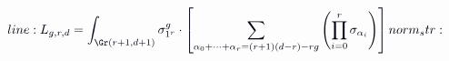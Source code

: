 \documentclass[12pt]{article}
\begin{document}
\makeatletter
\renewcommand*{\@textcolor}[3]{%
  \protect\leavevmode
  \begingroup
    \color#1{#2}#3%
  \endgroup
}
\makeatother
\begin{displaymath}
\mathcolor[RGB]{0,0,15}{line:
L_{g,r,d}=\int_{\Gr(r+1,d+1)}\sigma_{1^r}^g\cdot\left[\sum_{\alpha_0+\cdots+\alpha_r=(r+1)(d-r)-rg}\left(\prod_{i=0}^r\sigma_{\alpha_i}\right)\right]

norm_str:}
\end{displaymath}
\end{document}

